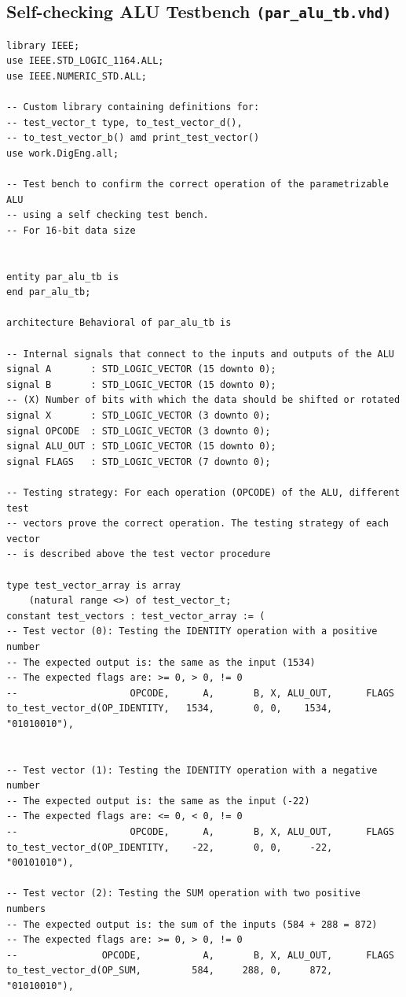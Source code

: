 \documentclass[10pt]{article}
\begin{document}
\subsection{Self-checking ALU Testbench \texttt{(par\_alu\_tb.vhd)}}
\begin{verbatim}
library IEEE;
use IEEE.STD_LOGIC_1164.ALL;
use IEEE.NUMERIC_STD.ALL;

-- Custom library containing definitions for:
-- test_vector_t type, to_test_vector_d(), 
-- to_test_vector_b() amd print_test_vector()
use work.DigEng.all;

-- Test bench to confirm the correct operation of the parametrizable ALU 
-- using a self checking test bench.
-- For 16-bit data size


entity par_alu_tb is
end par_alu_tb;

architecture Behavioral of par_alu_tb is

-- Internal signals that connect to the inputs and outputs of the ALU
signal A       : STD_LOGIC_VECTOR (15 downto 0);
signal B       : STD_LOGIC_VECTOR (15 downto 0);
-- (X) Number of bits with which the data should be shifted or rotated
signal X       : STD_LOGIC_VECTOR (3 downto 0); 
signal OPCODE  : STD_LOGIC_VECTOR (3 downto 0);
signal ALU_OUT : STD_LOGIC_VECTOR (15 downto 0);
signal FLAGS   : STD_LOGIC_VECTOR (7 downto 0);

-- Testing strategy: For each operation (OPCODE) of the ALU, different test
-- vectors prove the correct operation. The testing strategy of each vector
-- is described above the test vector procedure  

type test_vector_array is array 
	(natural range <>) of test_vector_t;
constant test_vectors : test_vector_array := (
-- Test vector (0): Testing the IDENTITY operation with a positive number
-- The expected output is: the same as the input (1534)
-- The expected flags are: >= 0, > 0, != 0
--                    OPCODE,      A,       B, X, ALU_OUT,      FLAGS
to_test_vector_d(OP_IDENTITY,   1534,       0, 0,    1534, "01010010"),


-- Test vector (1): Testing the IDENTITY operation with a negative number
-- The expected output is: the same as the input (-22)
-- The expected flags are: <= 0, < 0, != 0
--                    OPCODE,      A,       B, X, ALU_OUT,      FLAGS
to_test_vector_d(OP_IDENTITY,    -22,       0, 0,     -22, "00101010"),

-- Test vector (2): Testing the SUM operation with two positive numbers
-- The expected output is: the sum of the inputs (584 + 288 = 872)
-- The expected flags are: >= 0, > 0, != 0
--               OPCODE,           A,       B, X, ALU_OUT,      FLAGS
to_test_vector_d(OP_SUM,         584,     288, 0,     872, "01010010"),


\end{verbatim}
\end{document}

